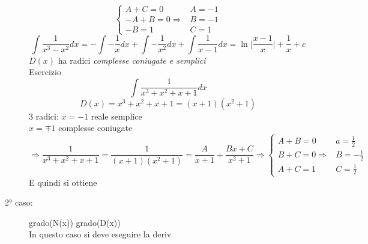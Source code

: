 \begin{description}
\begin{tasks}
\begin{equation*}
				\begin{cases}
					A+C=0&A=-1\\
					-A+B=0\Rightarrow&B=-1\\
					-B=1&C=1
				\end{cases}
			\end{equation*}
			\begin{equation*}
				\int \frac{1}{x^3-x^2}dx=-\int -\frac{1}{x}dx+\int-\frac{1}{x^2}dx+\int \frac{1}{x-1}dx=\ln\bigg|\frac{x-1}{x}\bigg|+\frac{1}{x}+c
			\end{equation*}
			\task $D(x)$ ha radici \textit{complesse coniugate e semplici}\\
				Esercizio
				\begin{equation*}
					\int \frac{1}{x^3+x^2+x+1}dx
				\end{equation*}
				\begin{equation*}
					D(x)=x^3+x^2+x+1=(x+1)(x^2+1)
				\end{equation*}
				3 radici: $x=-1$ reale semplice\\
				$x=\mp 1$ complesse coniugate
				\begin{equation*}
					\Rightarrow\frac{1}{x^3+x^2+x+1}=\frac{1}{(x+1)(x^2+1)}=\frac{A}{x+1}+\frac{Bx+C}{x^2+1}\Rightarrow
					 \begin{cases}
						A+B=0&a=\frac{1}{2}\\
						B+C=0\Rightarrow&B=-\frac{1}{2}\\
						A+C=1&C=\frac{1}{2}
					\end{cases}
				\end{equation*}
				E quindi si ottiene
		\end{tasks} 
		\item [2° caso: ] grado(N(x)) grado(D(x))\\
		In questo caso si deve eseguire la deriv
		
\end{description}

